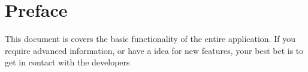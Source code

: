 \section{Preface}

This document is covers the basic functionality of the entire application. If you require advanced information, or have a idea for new features, your best bet is to get in contact with the developers
\setcounter{page}{1}